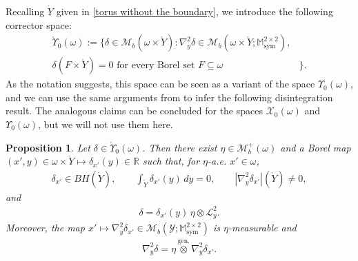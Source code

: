 \documentclass[reqno,10pt]{amsart}
\numberwithin{equation}{section}
\newtheorem{proposition}[theorem]{Proposition}
\theoremstyle{remark}
\newcommand{\calL}{\mathcal{L}}
\newcommand{\M}{\mathbb{M}}
\newcommand{\R}{\mathbb{R}}
\newcommand{\calY}{\mathcal{Y}}
\DeclareMathOperator{\sym}{sym}
\newcommand{\Mb}{\mathcal{M}_b}
\newcommand{\genprod}{\stackrel{\text{gen.}}{\otimes}}
\newcommand{\calXzero}[1]{\mathcal{X}_0({#1})}
\newcommand{\calYzero}[1]{\Upsilon_0({#1})}
\newcommand{\calZzero}[1]{\mathring{\Upsilon}_0({#1})}
\newcommand{\D}{\nabla}
\begin{document}
Recalling $\mathring{Y}$ given in \eqref{torus without the boundary}, we introduce the following corrector space:
\begin{align*}
	\calZzero{\omega} := \Big\{\delta \in \Mb(\omega \times \mathring{Y}) : {\D}^2_{y}\delta \in \Mb(\omega \times \mathring{Y};\M^{2 \times 2}_{\sym}),& \\
	\delta(F \times \mathring{Y}) = 0 \textrm{ for every Borel set } F \subseteq \omega & \Big\}.
\end{align*}
As the notation suggests, this space can be seen as a variant of the space $\calYzero{\omega}$, and we can use the same arguments from \cite[Section 4.1]{Buzancic.Davoli.Velcic.2024.1st} to infer the following disintegration result. The analogous claims can be concluded for the spaces $\calXzero\omega$ and $\calYzero\omega$, but we will not use them here. 

\begin{proposition} \label{corrector main property - regime zero without boundary of Y}
Let $\delta \in \calZzero{\omega}$. 
Then there exist $\eta \in \Mb^+(\omega)$ and a Borel map $(x',y) \in \omega \times \mathring{Y} \mapsto \delta_{x'}(y) \in \R$ such that, for $\eta$-a.e. $x' \in \omega$,
\begin{align*}
	\delta_{x'} \in BH(\mathring{Y}), \qquad \int_{\mathring{Y}} \delta_{x'}(y) \,dy = 0, \qquad |{\D}^2_{y}\delta_{x'}|(\mathring{Y}) \neq 0,
\end{align*}
and
\begin{align*}
	\delta = \delta_{x'}(y) \,\eta \otimes \calL^{2}_{y}.
\end{align*}
Moreover, the map $x' \mapsto {\D}^2_{y}\delta_{x'} \in \Mb(\calY;\M^{2 \times 2}_{\sym})$ is $\eta$-measurable and
\begin{align*}
	{\D}^2_{y}\delta = \eta \genprod {\D}^2_{y}\delta_{x'}.
\end{align*}
\end{proposition}
\end{document}
